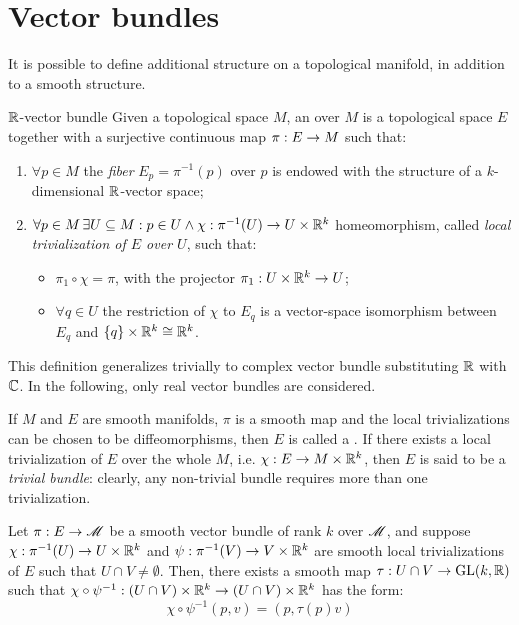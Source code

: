 \section{Vector bundles}

It is possible to define additional structure on a topological manifold, in addition to a smooth structure.

\begin{definition}{$ \mathbb{R} $-vector bundle}{}
  Given a topological space $ M $, an  over $ M $ is a topological space $ E $ together with a surjective continuous map $ \pi : E \rightarrow M $ such that:
  \begin{enumerate}
    \item $ \forall p \in M $ the \emph{fiber} $ E_p = \pi^{-1}(p) $ over $ p $ is endowed with the structure of a $ k $-dimensional $ \mathbb{R} $-vector space;
    \item $ \forall p \in M \, \exists U \subseteq M : p \in U \land \chi : \pi^{-1}(U) \rightarrow U \times \mathbb{R}^k $ homeomorphism, called \emph{local trivialization of $ E $ over $ U $}, such that:
      \begin{itemize}
        \item $ \pi_1 \circ \chi = \pi $, with the projector $ \pi_1 : U \times \mathbb{R}^k \rightarrow U $;
        \item $ \forall q \in U $ the restriction of $ \chi $ to $ E_q $ is a vector-space isomorphism between $ E_q $ and $ \{q\} \times \mathbb{R}^k \cong \mathbb{R}^k $.
      \end{itemize}
  \end{enumerate}
\end{definition}

This definition generalizes trivially to complex vector bundle substituting $ \mathbb{R} $ with $ \mathbb{C} $. In the following, only real vector bundles are considered.

If $ M $ and $ E $ are smooth manifolds, $ \pi $ is a smooth map and the local trivializations can be chosen to be diffeomorphisms, then $ E $ is called a . If there exists a local trivialization of $ E $ over the whole $ M $, i.e. $ \chi : E \rightarrow M \times \mathbb{R}^k $, then $ E $ is said to be a \emph{trivial bundle}: clearly, any non-trivial bundle requires more than one trivialization.

\begin{lemma}{}{}
  Let $ \pi : E \rightarrow \mathscr{M} $ be a smooth vector bundle of rank $ k $ over $ \mathscr{M} $, and suppose $ \chi : \pi^{-1}(U) \rightarrow U \times \mathbb{R}^k $ and $ \psi : \pi^{-1}(V) \rightarrow V \times \mathbb{R}^k $ are smooth local trivializations of $ E $ such that $ U \cap V \neq \emptyset $. Then, there exists a smooth map $ \tau : U \cap V \rightarrow \mathrm{GL}(k,\mathbb{R}) $ such that $ \chi \circ \psi^{-1} : (U \cap V) \times \mathbb{R}^k \rightarrow (U \cap V) \times \mathbb{R}^k $ has the form:
  \begin{equation}
    \chi \circ \psi^{-1}(p,v) = (p , \tau(p)v)
  \end{equation}
\end{lemma}

